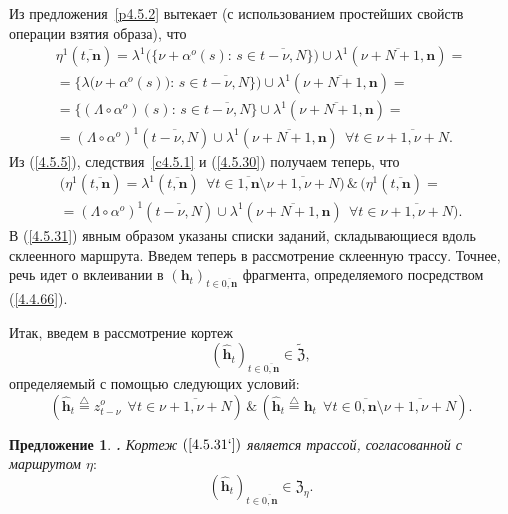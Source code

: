 \documentclass[11pt,twoside,openany]{report}
\newcommand{\bfn}{\begin{equation}}
\newcommand{\efn}{\end{equation}}
\newcommand{\df}{\stackrel{\triangle}{=}}
\newcommand{\ov}{\overline}
\newcounter{theo}
\newcounter{pred}
\newtheorem{pred}{Предложение}[section]
\newcommand{\TL}{\mbox{\bf{$\!\!$.}}}
\newcommand{\La}{\Lambda}
\newcommand{\la}{\lambda}
\newcommand{\al}{\alpha}
\newcommand{\fa}{\forall}
\begin{document}
{{Из предложения~\ref{p4.5.2} вытекает (с использованием простейших свойств
операции взятия образа), что
\begin{eqnarray}
&\eta^1(\ov{t,\mathbf{n}}) = \la^1\bigl(\{\nu + \al^o(s):\,s\in \ov{t-\nu,N}\}\bigl)
\cup \la^1 (\ov{\nu+N+1,\mathbf{n}}) =
&\nonumber\\
&=\{\la\bigl(\nu+\al^o(s)\bigl):\,s\in \ov{t-\nu,N}\}) \cup \la^1(\ov{\nu+N+1,\mathbf{n}})=
&\nonumber\\
&= \{(\La \circ \al^o)(s):\,s\in\ov{t-\nu,N}\} \cup \la^1(\ov{\nu+N+1,\mathbf{n}}) =
&\nonumber\\
&= (\La\circ \al^o)^1(\ov{t-\nu,N}) \cup \la^1(\ov{\nu+N+1,\mathbf{n}})\ \ \fa t\in \ov{\nu+1,\nu+N}.
&\label{4.5.30}
\end{eqnarray}
Из (\ref{4.5.5}), следствия~\ref{c4.5.1}  и (\ref{4.5.30}) получаем теперь, что
\begin{eqnarray}
&\bigl(\eta^1(\ov{t,\mathbf{n}}) = \la^1(\ov{t,\mathbf{n}})\ \ \fa t\in
\ov{1,\mathbf{n}}\setminus \ov{\nu+1,\nu+N}\bigl)\,\&\,\bigl(\eta^1(\ov{t,\mathbf{n}}) =
&\nonumber\\
&=(\La\circ \al^o)^1(\ov{t-\nu,N}) \cup \la^1(\ov{\nu+N+1,\mathbf{n}})\ \ \fa t\in \ov{\nu+1,\nu+N}\bigl).
&\label{4.5.31}
\end{eqnarray}
В (\ref{4.5.31}) явным образом указаны списки заданий, складывающиеся вдоль
склеенного маршрута. Введем теперь в рассмотрение склеенную трассу. Точнее,
речь идет о вклеивании в $(\mathbf{h}_t)_{t\in \ov{0,\mathbf{n}}}$  фрагмента,
определяемого посредством (\ref{4.4.66}).

Итак, введем в рассмотрение кортеж
\bfn\label{4.5.31`}(\hat{\mathbf{h}}_t)_{t\in \ov{0,\mathbf{n}}}\in \widetilde{\mathfrak{Z}},
\efn
определяемый с помощью следующих условий:
\bfn\label{4.5.32}(\hat{\mathbf{h}}_t \df z_{t-\nu}^o\ \ \fa t\in \ov{\nu+1,\nu+N})\,
\&\,(\hat{\mathbf{h}}_t \df \mathbf{h}_t\ \ \fa t\in \ov{0,\mathbf{n}}\setminus \ov{\nu+1,\nu+N}).
\efn

\begin{pred}\label{p4.5.3}{\TL} Кортеж $(\ref{4.5.31`})$ является трассой,
согласованной с маршрутом $\eta:$
\bfn\label{4.5.33}(\hat{\mathbf{h}}_t)_{t\in \ov{0,\mathbf{n}}}\in \mathfrak{Z}_\eta.
\efn
\end{pred}

}}
\end{document}
